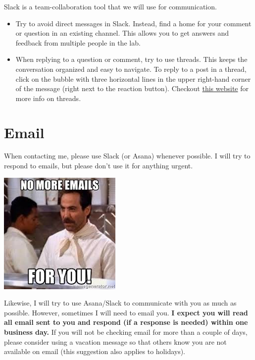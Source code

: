 \documentclass[]{book}
\providecommand{\tightlist}{%
  \setlength{\itemsep}{0pt}\setlength{\parskip}{0pt}}
\begin{document}
Slack is a team-collaboration tool that we will use for communication.

\begin{itemize}
\tightlist
\item
  Try to avoid direct messages in Slack. Instead, find a home for your comment or question in an existing channel. This allows you to get answers and feedback from multiple people in the lab.\\
\item
  When replying to a question or comment, try to use threads. This keeps the conversation organized and easy to navigate. To reply to a post in a thread, click on the bubble with three horizontal lines in the upper right-hand corner of the message (right next to the reaction button). Checkout \href{https://slack.com/help/articles/115000769927-Use-threads-to-organize-discussions-}{this website} for more info on threads.
\end{itemize}

\hypertarget{email}{%
\section{Email}\label{email}}

When contacting me, please use Slack (or Asana) whenever possible. I will try to respond to emails, but please don't use it for anything urgent.

\includegraphics{images/email2.jpeg}

Likewise, I will try to use Asana/Slack to communicate with you as much as possible. However, sometimes I will need to email you. \textbf{I expect you will read all email sent to you and respond (if a response is needed) within one business day.} If you will not be checking email for more than a couple of days, please consider using a vacation message so that others know you are not available on email (this suggestion also applies to holidays).
\end{document}
